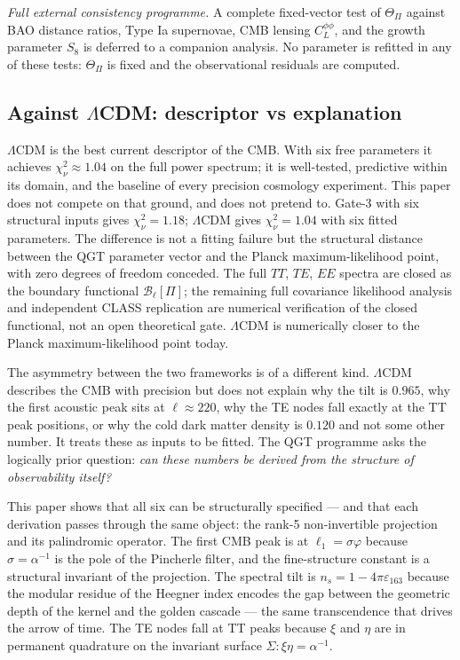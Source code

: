 \documentclass[twocolumn,10pt]{article}
\newcommand{\vp}{\varphi}
\begin{document}
\medskip
\noindent\textit{Full external consistency programme.}
A complete fixed-vector test of $\Theta_\Pi$ against BAO distance
ratios, Type Ia supernovae, CMB lensing $C_L^{\phi\phi}$, and the
growth parameter $S_8$ is deferred to a companion analysis.
No parameter is refitted in any of these tests: $\Theta_\Pi$ is
fixed and the observational residuals are computed.

\subsection{Against $\Lambda$CDM: descriptor vs explanation}

$\Lambda$CDM is the best current descriptor of the CMB. With six free
parameters it achieves $\chi^2_\nu\approx1.04$ on the full power
spectrum; it is well-tested, predictive within its domain, and the
baseline of every precision cosmology experiment. This paper does not
compete on that ground, and does not pretend to. Gate-3 with six structural inputs gives $\chi^2_\nu=1.18$;
$\Lambda$CDM gives $\chi^2_\nu=1.04$ with six fitted parameters.
The difference is not a fitting failure but the structural distance
between the QGT parameter vector and the Planck maximum-likelihood point,
with zero degrees of freedom conceded.
The full $TT$, $TE$, $EE$ spectra are closed as the boundary functional
$\mathcal{B}_\ell[\Pi]$; the remaining full covariance likelihood analysis
and independent CLASS replication are numerical verification of the
closed functional, not an open theoretical gate.
$\Lambda$CDM is numerically closer to the Planck maximum-likelihood point today.

The asymmetry between the two frameworks is of a different kind.
$\Lambda$CDM describes the CMB with precision but does not explain why
the tilt is $0.965$, why the first acoustic peak sits at
$\ell\approx220$, why the TE nodes fall exactly at the TT peak
positions, or why the cold dark matter density is $0.120$ and not
some other number. It treats these as inputs to be fitted. The QGT
programme asks the logically prior question: \emph{can these numbers
be derived from the structure of observability itself?}

This paper shows that all six can be structurally specified — and that
each derivation passes through the same object: the rank-5
non-invertible projection and its palindromic operator. The first
CMB peak is at $\ell_1=\sigma\vp$ because $\sigma=\alpha^{-1}$ is the
pole of the Pincherle filter, and the fine-structure constant is a
structural invariant of the projection. The spectral tilt is
$n_s=1-4\pi\varepsilon_{163}$ because the modular residue of the
Heegner index encodes the gap between the geometric depth of the
kernel and the golden cascade --- the same transcendence that drives
the arrow of time. The TE nodes fall at TT peaks because $\xi$ and
$\eta$ are in permanent quadrature on the invariant surface
$\Sigma:\xi\eta=\alpha^{-1}$.
\end{document}
